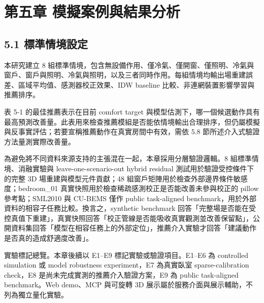 \documentclass[12pt,a4paper]{article}
\begin{document}
\clearpage

\section*{第五章 模擬案例與結果分析}

\subsection*{5.1 標準情境設定}

本研究建立 8 組標準情境，包含無設備作用、僅冷氣、僅開窗、僅照明、冷氣與窗戶、窗戶與照明、冷氣與照明，以及三者同時作用。每組情境均輸出場重建誤差、區域平均值、感測器校正效果、IDW baseline 比較、非連網裝置影響學習與推薦排序。


表 5-1 的最佳推薦表示在目前 comfort target 與模型估測下，哪一個候選動作具有最高預測改善量。此表用來檢查推薦模組是否能依情境輸出合理排序，但仍屬模擬與反事實評估；若要宣稱推薦動作在真實房間中有效，需依 5.8 節所述介入式驗證方法量測實際改善量。


為避免將不同資料來源支持的主張混在一起，本章採用分層驗證邏輯。8 組標準情境、消融實驗與 leave-one-scenario-out hybrid residual 測試用於驗證受控條件下的完整 3D 場重建與模型元件貢獻；48 組窗戶矩陣用於檢查外部邊界條件敏感度；bedroom\_\allowbreak{}01 真實快照用於檢查稀疏感測校正是否能改善未參與校正的 pillow 參考點；SML2010 與 CU-BEMS 僅作 public task-aligned benchmark，用於外部資料的相容子任務比較。換言之，synthetic benchmark 回答「完整場是否能在受控真值下重建」，真實快照回答「校正管線是否能吸收真實觀測並改善保留點」，公開資料集回答「模型在相容任務上的外部定位」，推薦介入實驗才回答「建議動作是否真的造成舒適度改善」。


實驗標記總覽。本章後續以 E1--E9 標記實驗或驗證項目。E1--E6 為 controlled simulation 或 model robustness experiment，E7 為真實臥室 sparse-calibration check，E8 是尚未完成實測的推薦介入驗證方案，E9 為 public task-aligned benchmark。Web demo、MCP 與可旋轉 3D 展示屬於服務介面與展示輔助，不列為獨立量化實驗。
\end{document}
